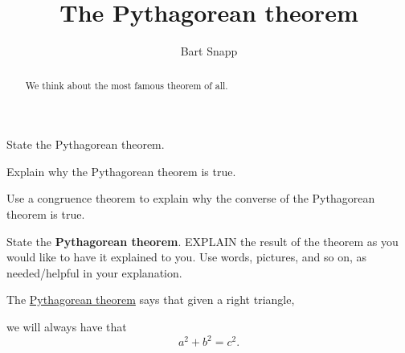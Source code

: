 \documentclass[noauthor,nooutcomes,handout,12pt]{ximera}
\title{The Pythagorean theorem}
\author{Bart Snapp}
\begin{document}
\begin{abstract}
  We think about the most famous theorem of all.
\end{abstract}
\maketitle


\begin{listOutcomes}
\item{State the Pythagorean theorem.}
\item{Explain why the Pythagorean theorem is true.}
\item{Use a congruence theorem to explain why the converse of the
  Pythagorean theorem is true.}
\end{listOutcomes}
\mynewpage

\begin{question}
  State the \textbf{Pythagorean theorem}. EXPLAIN the result of the theorem as
  you would like to have it explained to you.  Use words, pictures,
  and so on, as needed/helpful in your explanation.
  \begin{freeResponse}
    The \underline{Pythagorean theorem} says that given a right
    triangle,
    \begin{center}
    \end{center}
    we will always have that
    \[
    a^2 + b^2 = c^2.
    \]
  \end{freeResponse}
\end{question}
\mynewpage
\end{document}
